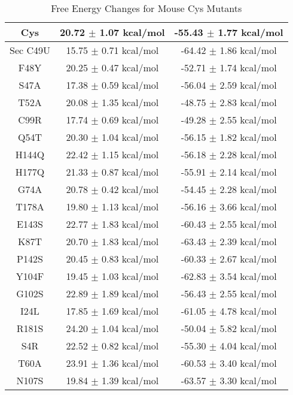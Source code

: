 \documentclass{article}
\begin{document}
\begin{table}[ht]
    \centering
    \begin{tabular}{|c|c|c|}
    \hline
    Cys & 20.72 $\pm$ 1.07 kcal/mol & -55.43 $\pm$ 1.77 kcal/mol \\
    \hline
    Sec C49U & 15.75 $\pm$ 0.71 kcal/mol & -64.42 $\pm$ 1.86 kcal/mol \\
    \hline
    F48Y & 20.25 $\pm$ 0.47 kcal/mol & -52.71 $\pm$ 1.74 kcal/mol \\
    \hline
    S47A & 17.38 $\pm$ 0.59 kcal/mol & -56.04 $\pm$ 2.59 kcal/mol \\
    \hline
    T52A & 20.08 $\pm$ 1.35 kcal/mol & -48.75 $\pm$ 2.83 kcal/mol \\
    \hline
    C99R & 17.74 $\pm$ 0.69 kcal/mol & -49.28 $\pm$ 2.55 kcal/mol \\
    \hline
    Q54T & 20.30 $\pm$ 1.04 kcal/mol & -56.15 $\pm$ 1.82 kcal/mol \\
    \hline
    H144Q & 22.42 $\pm$ 1.15 kcal/mol & -56.18 $\pm$ 2.28 kcal/mol \\
    \hline
    H177Q & 21.33 $\pm$ 0.87 kcal/mol & -55.91 $\pm$ 2.14 kcal/mol \\
    \hline
    G74A & 20.78 $\pm$ 0.42 kcal/mol & -54.45 $\pm$ 2.28 kcal/mol \\
    \hline
    T178A & 19.80 $\pm$ 1.13 kcal/mol & -56.16 $\pm$ 3.66 kcal/mol \\
    \hline
    E143S & 22.77 $\pm$ 1.83 kcal/mol & -60.43 $\pm$ 2.55 kcal/mol \\
    \hline
    K87T & 20.70 $\pm$ 1.83 kcal/mol & -63.43 $\pm$ 2.39 kcal/mol \\
    \hline
    P142S & 20.45 $\pm$ 0.83 kcal/mol & -60.33 $\pm$ 2.67 kcal/mol \\
    \hline
    Y104F & 19.45 $\pm$ 1.03 kcal/mol & -62.83 $\pm$ 3.54 kcal/mol \\
    \hline
    G102S & 22.89 $\pm$ 1.89 kcal/mol & -56.43 $\pm$ 2.55 kcal/mol \\
    \hline
    I24L & 17.85 $\pm$ 1.69 kcal/mol & -61.05 $\pm$ 4.78 kcal/mol \\
    \hline
    R181S & 24.20 $\pm$ 1.04 kcal/mol & -50.04 $\pm$ 5.82 kcal/mol \\
    \hline
    S4R & 22.52 $\pm$ 0.82 kcal/mol & -55.30 $\pm$ 4.04 kcal/mol \\
    \hline
    T60A & 23.91 $\pm$ 1.36 kcal/mol & -60.53 $\pm$ 3.40 kcal/mol \\
    \hline
    N107S & 19.84 $\pm$ 1.39 kcal/mol & -63.57 $\pm$ 3.30 kcal/mol \\
    \hline
    \end{tabular}
    \caption{Free Energy Changes for Mouse Cys Mutants}
\end{table}
\end{document}
